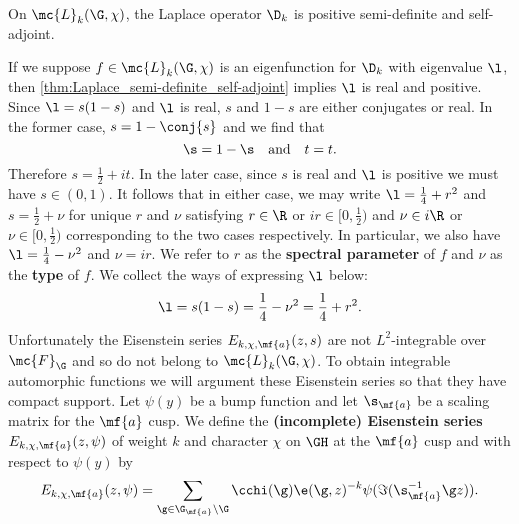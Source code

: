     \begin{theorem}\label{thm:Laplace_semi-definite_self-adjoint}
      On $\mc{L}_{k}(\G,\chi)$, the Laplace operator $\D_{k}$ is positive semi-definite and self-adjoint.
    \end{theorem}

    If we suppose $f \in \mc{L}_{k}(\G,\chi)$ is an eigenfunction for $\D_{k}$ with eigenvalue $\l$, then \cref{thm:Laplace_semi-definite_self-adjoint} implies $\l$ is real and positive. Since $\l = s(1-s)$ and $\l$ is real, $s$ and $1-s$ are either conjugates or real. In the former case, $s = 1-\conj{s}$ and we find that
    \[
      \s = 1-\s \quad \text{and} \quad t = t.
    \]
    Therefore $s = \frac{1}{2}+it$. In the later case, since $s$ is real and $\l$ is positive we must have $s \in (0,1)$. It follows that in either case, we may write $\l = \frac{1}{4}+r^{2}$ and $s = \frac{1}{2}+\nu$ for unique $r$ and $\nu$ satisfying $r \in \R$ or $ir \in \big[0,\frac{1}{2}\big)$ and $\nu \in i\R$ or $\nu \in \big[0,\frac{1}{2}\big)$ corresponding to the two cases respectively. In particular, we also have $\l = \frac{1}{4}-\nu^{2}$ and $\nu = ir$. We refer to $r$ as the \textbf{spectral parameter} of $f$ and $\nu$ as the \textbf{type} of $f$. We collect the ways of expressing $\l$ below:
    \[
      \l = s(1-s) = \frac{1}{4}-\nu^{2} = \frac{1}{4}+r^{2}.
    \]
    Unfortunately the Eisenstein series $E_{k,\chi,\mf{a}}(z,s)$ are not $L^{2}$-integrable over $\mc{F}_{\G}$ and so do not belong to $\mc{L}_{k}(\G,\chi)$. To obtain integrable automorphic functions we will argument these Eisenstein series so that they have compact support. Let $\psi(y)$ be a bump function and let $\s_{\mf{a}}$ be a scaling matrix for the $\mf{a}$ cusp. We define the \textbf{(incomplete) Eisenstein series} $E_{k,\chi,\mf{a}}(z,\psi)$ of weight $k$ and character $\chi$ on $\GH$ at the $\mf{a}$ cusp and with respect to $\psi(y)$ by
    \[
      E_{k,\chi,\mf{a}}(z,\psi) = \sum_{\g \in \G_{\mf{a}}\backslash\G}\cchi(\g)\e(\g,z)^{-k}\psi(\Im(\s_{\mf{a}}^{-1}\g z)).
    \]
